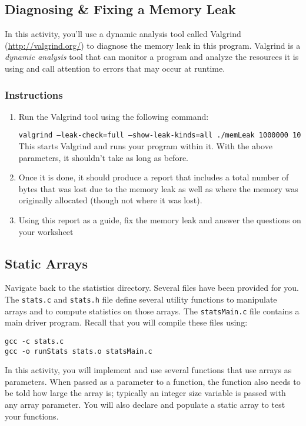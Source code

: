 \documentclass[12pt]{scrartcl}
\begin{document}
\subsection{Diagnosing \& Fixing a Memory Leak}

In this activity, you'll use a dynamic analysis tool called
Valgrind (\url{http://valgrind.org/}) to diagnose the memory leak
in this program.  Valgrind is a \emph{dynamic analysis} tool that
can monitor a program and analyze the resources it is using and
call attention to errors that may occur at runtime.

\subsubsection*{Instructions}
\begin{enumerate}
  \item Run the Valgrind tool using the following command:

\texttt{valgrind --leak-check=full --show-leak-kinds=all ./memLeak 1000000 10}
   This starts Valgrind and runs your program within it.  With the above
   parameters, it shouldn't take as long as before.
  \item Once it is done, it should produce a report that includes a total number of
  bytes that was lost due to the memory leak as well as where the memory
  was originally allocated (though not where it was lost).
  \item Using this report as a guide, fix the memory leak and answer
  the questions on your worksheet
\end{enumerate}

\subsection{Static Arrays}

Navigate back to the statistics directory.  Several files have been
provided for you.  The \texttt{stats.c} and \texttt{stats.h}
file define several utility functions to manipulate arrays and to
compute statistics on those arrays.  The \texttt{statsMain.c}
file contains a main driver program.  Recall that you will compile
these files using:

\begin{verbatim}
gcc -c stats.c
gcc -o runStats stats.o statsMain.c
\end{verbatim}

In this activity, you will implement and use several functions that use
arrays as parameters.  When passed as a parameter to a function,
the function also needs to be told how large the array is; typically an
integer size variable is passed with any array parameter.  You will also
declare and populate a static array to test your functions.
\end{document}
